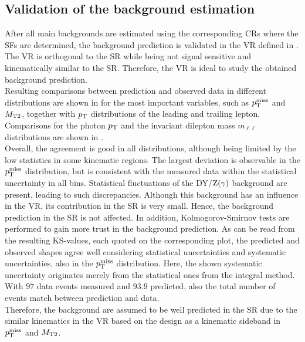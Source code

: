 \FloatBarrier
\subsection{Validation of the background estimation}\label{sec:Validation}
After all main backgrounds are estimated using the corresponding CRs where the SFs are determined, the background prediction is validated in the VR defined in . The VR is orthogonal to the SR while being not signal sensitive and kinematically similar to the SR. Therefore, the VR is ideal to study the obtained background prediction.\\
Resulting comparisons between prediction and observed data in different distributions are shown in  for the most important variables, such as $p_{\mathrm{T}}^\text{miss}$ and $M_{\mathrm{T2}}$, together with $p_{\mathrm{T}}$ distributions of the leading and trailing lepton. Comparisons for the photon $p_{\mathrm{T}}$ and the invariant dilepton mass $m_{\ell\ell}$ distributions are shown in .\\
Overall, the agreement is good in all distributions, although being limited by the low statistics in some kinematic regions. The largest deviation is observable in the $p_{\mathrm{T}}^\text{miss}$ distribution, but is consistent with the measured data within the statistical uncertainty in all bins. Statistical fluctuations of the DY/$\mathrm{Z}(\gamma)$ background are present, leading to such discrepancies. Although this background has an influence in the VR, its contribution in the SR is very small. Hence, the background prediction in the SR is not affected. In addition, Kolmogorov-Smirnov tests are performed to gain more trust in the background prediction. As can be read from the resulting KS-values, each quoted on the corresponding plot, the predicted and observed shapes agree well considering statistical uncertainties and systematic uncertainties, also in the $p_{\mathrm{T}}^\text{miss}$ distribution. Here, the shown systematic uncertainty originates merely from the statistical ones from the integral method. With $97$ data events measured and $93.9$ predicted, also the total number of events match between prediction and data.\\
Therefore, the background are assumed to be well predicted in the SR due to the similar kinematics in the VR based on the design as a kinematic sideband in $p_{\mathrm{T}}^\text{miss}$ and $M_{\mathrm{T2}}$.
